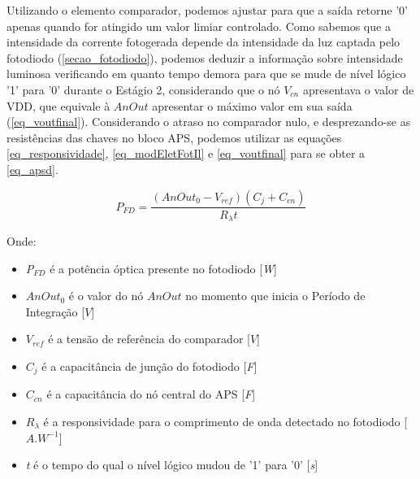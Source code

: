 Utilizando o elemento comparador, podemos ajustar para que a sa\'ida retorne '0' apenas quando for atingido um valor limiar controlado. Como sabemos que a intensidade da corrente fotogerada depende da intensidade da luz captada pelo fotodiodo (\autoref{secao_fotodiodo}), podemos deduzir a informação sobre intensidade luminosa verificando em quanto tempo demora para que se mude de n\'ivel l\'ogico '1' para '0' durante o Est\'agio 2, considerando que o nó $V_{cn}$ apresentava o valor de VDD, que equivale à $AnOut$ apresentar o máximo valor em sua saída (\autoref{eq_voutfinal}). Considerando o atraso no comparador nulo, e desprezando-se as resistências das chaves no bloco APS, podemos utilizar as equações \ref{eq_responsividade}, \ref{eq_modEletFotIl} e \ref{eq_voutfinal} para se obter a \autoref{eq_apsd}.

\begin{equation}
    \label{eq_apsd}
    P_{FD} = \frac{(AnOut_0-V_{ref})(C_{j}+C_{cn})}{R_{\lambda}t}
\end{equation}

Onde:

\begin{itemize}

    \item \textit{P$_{FD}$} \'e a pot\^encia \'optica presente no fotodiodo [\textit{W}]
    \item $AnOut_0$ \'e o valor do nó $AnOut$ no momento que inicia o Período de Integração [$V$]
    \item \textit{$V_{ref}$} \'e a tensão de refer\^encia do comparador [$V$]
    \item \textit{$C_j$} \'e a capacit\^ancia de junção do fotodiodo [\textit{F}]
    \item \textit{$C_{cn}$} \'e a capacit\^ancia do n\'o central do APS [\textit{F}]
    \item $R_{\lambda}$ \'e a responsividade para o comprimento de onda detectado no fotodiodo [$A.W^{-1}$]
    \item \textit{t} \'e o tempo do qual o n\'ivel l\'ogico mudou de '1' para '0' [\textit{s}]
    
\end{itemize}